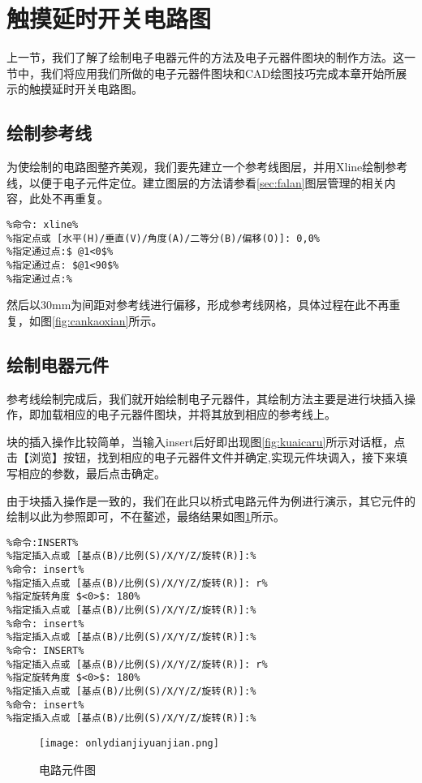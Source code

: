 \section{触摸延时开关电路图}
上一节，我们了解了绘制电子电器元件的方法及电子元器件图块的制作方法。这一节中，我们将应用我们所做的电子元器件图块和CAD绘图技巧完成本章开始所展示的触摸延时开关电路图。
\subsection{绘制参考线}
为使绘制的电路图整齐美观，我们要先建立一个参考线图层，并用Xline绘制参考线，以便于电子元件定位。建立图层的方法请参看\ref{sec:falan}图层管理的相关内容，此处不再重复。

\begin{lstlisting}
%命令: xline%
%指定点或 [水平(H)/垂直(V)/角度(A)/二等分(B)/偏移(O)]: 0,0%
%指定通过点:$ @1<0$%
%指定通过点: $@1<90$%
%指定通过点:%
\end{lstlisting}
然后以30mm为间距对参考线进行偏移，形成参考线网格，具体过程在此不再重复，如图\ref{fig:cankaoxian}所示。

\noindent
\begin{figure}[htbp]
\centering
\begin{floatrow}
\end{floatrow}
\end{figure}
\subsection{绘制电器元件}
参考线绘制完成后，我们就开始绘制电子元器件，其绘制方法主要是进行块插入操作，即加载相应的电子元器件图块，并将其放到相应的参考线上。

块的插入操作比较简单，当输入insert后好即出现图\ref{fig:kuaicaru}所示对话框，点击【浏览】按钮，找到相应的电子元器件文件并确定,实现元件块调入，接下来填写相应的参数，最后点击确定。

由于块插入操作是一致的，我们在此只以桥式电路元件为例进行演示，其它元件的绘制以此为参照即可，不在鳌述，最络结果如图\ref{fig:onlydianziyujian}所示。
\begin{lstlisting}
%命令:INSERT%
%指定插入点或 [基点(B)/比例(S)/X/Y/Z/旋转(R)]:%
%命令: insert%
%指定插入点或 [基点(B)/比例(S)/X/Y/Z/旋转(R)]: r%
%指定旋转角度 $<0>$: 180%
%指定插入点或 [基点(B)/比例(S)/X/Y/Z/旋转(R)]:%
%命令: insert%
%指定插入点或 [基点(B)/比例(S)/X/Y/Z/旋转(R)]:%
%命令: INSERT%
%指定插入点或 [基点(B)/比例(S)/X/Y/Z/旋转(R)]: r%
%指定旋转角度 $<0>$: 180%
%指定插入点或 [基点(B)/比例(S)/X/Y/Z/旋转(R)]:%
%命令: insert%
%指定插入点或 [基点(B)/比例(S)/X/Y/Z/旋转(R)]:%
\end{lstlisting}
\noindent
\begin{figure}
\centering
\texttt{[image: onlydianjiyuanjian.png]}
\caption{电路元件图}\label{fig:onlydianziyujian}
\end{figure}
